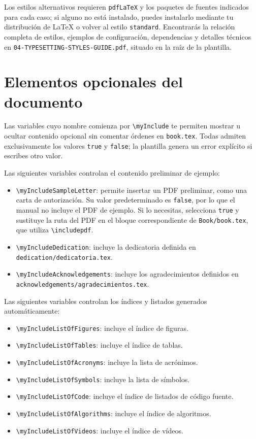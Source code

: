 Los estilos alternativos requieren \texttt{pdfLaTeX} y los paquetes de fuentes indicados para cada caso; si alguno no está instalado, puedes instalarlo mediante tu distribución de \LaTeX{} o volver al estilo \texttt{standard}. Encontrarás la relación completa de estilos, ejemplos de configuración, dependencias y detalles técnicos en \texttt{04-TYPESETTING-STYLES-GUIDE.pdf}, situado en la raíz de la plantilla.

\section{Elementos opcionales del documento}
\label{sec:elementos-opcionales-configuracion}

Las variables cuyo nombre comienza por \texttt{\textbackslash{}myInclude} te permiten mostrar u ocultar contenido opcional sin comentar órdenes en \texttt{book.tex}. Todas admiten exclusivamente los valores \texttt{true} y \texttt{false}; la plantilla genera un error explícito si escribes otro valor.

Las siguientes variables controlan el contenido preliminar de ejemplo:

\begin{itemize}
  \item \texttt{\textbackslash{}myIncludeSampleLetter}: permite insertar un PDF preliminar, como una carta de autorización. Su valor predeterminado es \texttt{false}, por lo que el manual no incluye el PDF de ejemplo. Si lo necesitas, selecciona \texttt{true} y sustituye la ruta del PDF en el bloque correspondiente de \texttt{Book/book.tex}, que utiliza \texttt{\textbackslash{}includepdf}.
  \item \texttt{\textbackslash{}myIncludeDedication}: incluye la dedicatoria definida en \texttt{dedication/dedicatoria.tex}.
  \item \texttt{\textbackslash{}myIncludeAcknowledgements}: incluye los agradecimientos definidos en \texttt{acknowledgements/agradecimientos.tex}.
\end{itemize}

Las siguientes variables controlan los índices y listados generados automáticamente:

\begin{itemize}
  \item \texttt{\textbackslash{}myIncludeListOfFigures}: incluye el índice de figuras.
  \item \texttt{\textbackslash{}myIncludeListOfTables}: incluye el índice de tablas.
  \item \texttt{\textbackslash{}myIncludeListOfAcronyms}: incluye la lista de acrónimos.
  \item \texttt{\textbackslash{}myIncludeListOfSymbols}: incluye la lista de símbolos.
  \item \texttt{\textbackslash{}myIncludeListOfCode}: incluye el índice de listados de código fuente.
  \item \texttt{\textbackslash{}myIncludeListOfAlgorithms}: incluye el índice de algoritmos.
  \item \texttt{\textbackslash{}myIncludeListOfVideos}: incluye el índice de vídeos.
\end{itemize}


